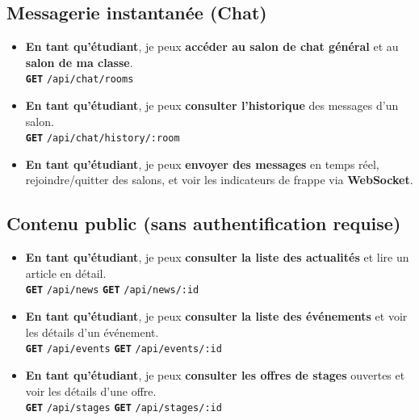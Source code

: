 \documentclass[12pt,a4paper]{article}
\newcommand{\route}[1]{\texorpdfstring{\texttt{\small\color{routeGray}#1}}{#1}}
\newcommand{\httpmethod}[1]{%
  \ifstrequal{#1}{GET}{\colorbox{blue!15}{\texttt{\bfseries\color{blue!70!black}GET}}}{}%
  \ifstrequal{#1}{POST}{\colorbox{green!18}{\texttt{\bfseries\color{green!60!black}POST}}}{}%
  \ifstrequal{#1}{PUT}{\colorbox{orange!18}{\texttt{\bfseries\color{orange!70!black}PUT}}}{}%
  \ifstrequal{#1}{DELETE}{\colorbox{red!15}{\texttt{\bfseries\color{red!70!black}DELETE}}}{}%
}
\newcommand{\usmark}{\color{accentGold}$\blacktriangleright$\;}
\begin{document}
\begin{studentbox}
\subsection*{Messagerie instantanée (Chat)}

\begin{itemize}[leftmargin=1.2cm, labelsep=0.4cm]
  \item[\usmark] \textbf{En tant qu'étudiant}, je peux \textbf{accéder au salon de chat général} et au \textbf{salon de ma classe}.\\
    \httpmethod{GET} \route{/api/chat/rooms}

  \item[\usmark] \textbf{En tant qu'étudiant}, je peux \textbf{consulter l'historique} des messages d'un salon.\\
    \httpmethod{GET} \route{/api/chat/history/:room}

  \item[\usmark] \textbf{En tant qu'étudiant}, je peux \textbf{envoyer des messages} en temps réel, rejoindre/quitter des salons, et voir les indicateurs de frappe via \textbf{WebSocket}.
\end{itemize}

\subsection*{Contenu public (sans authentification requise)}

\begin{itemize}[leftmargin=1.2cm, labelsep=0.4cm]
  \item[\usmark] \textbf{En tant qu'étudiant}, je peux \textbf{consulter la liste des actualités} et lire un article en détail.\\
    \httpmethod{GET} \route{/api/news} \quad \httpmethod{GET} \route{/api/news/:id}

  \item[\usmark] \textbf{En tant qu'étudiant}, je peux \textbf{consulter la liste des événements} et voir les détails d'un événement.\\
    \httpmethod{GET} \route{/api/events} \quad \httpmethod{GET} \route{/api/events/:id}

  \item[\usmark] \textbf{En tant qu'étudiant}, je peux \textbf{consulter les offres de stages} ouvertes et voir les détails d'une offre.\\
    \httpmethod{GET} \route{/api/stages} \quad \httpmethod{GET} \route{/api/stages/:id}
\end{itemize}

\end{studentbox}
\end{document}
